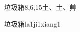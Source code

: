 \begin{entry}{垃圾箱}{8,6,15}{⼟、⼟、⾋}
  \begin{phonetics}{垃圾箱}{la1ji1xiang1}
  \end{phonetics}
\end{entry}
